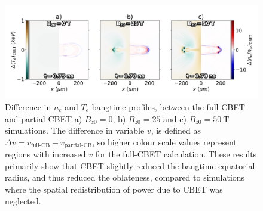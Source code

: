 \begin{figure}[t!]
    \includegraphics[width=\linewidth]{Results2/Images/CBETshape_stag_diff.png}
    \centering
    \caption{Difference in $n_e$ and $T_e$ bangtime profiles, between the full-\ac{CBET} and partial-\ac{CBET} a) $B_{z0}=0$, b) $B_{z0}=25$ and c) $B_{z0}=50\ \text{T}$ simulations.
    The difference in variable $v$, is defined as $\Delta v = v_{\text{full-CB}}-v_{\text{partial-CB}}$, so higher colour scale values represent regions with increased $v$ for the full-\ac{CBET} calculation.
    These results primarily show that \ac{CBET} slightly reduced the bangtime equatorial radius, and thus reduced the oblateness, compared to simulations where the spatial redistribution of power due to \ac{CBET} was neglected.}%
    \label{fig:Res2_CBETshape_diff}
\end{figure}

